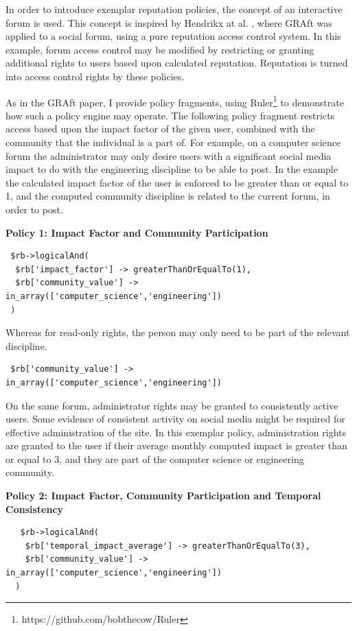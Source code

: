 In order to introduce exemplar reputation policies, the concept of an interactive forum is used. This concept is inspired by Hendrikx at al. \cite{graft_paper}, where GRAft was applied to a social forum, using a pure reputation access control system. In this example, forum access control may be modified by restricting or granting additional rights to users based upon calculated reputation. Reputation is turned into access control rights by these policies.

As in the GRAft paper, I provide policy fragments, using Ruler\footnote{https://github.com/bobthecow/Ruler} to demonstrate how such a policy engine may operate. The following policy fragment restricts access based upon the impact factor of the given user, combined with the community that the individual is a part of. For example, on a computer science forum the administrator may only desire users with a significant social media impact to do with the engineering discipline to be able to post. In the example the calculated impact factor of the user is enforced to be greater than or equal to 1, and the computed community discipline is related to the current forum, in order to post. 


\begin{center}
 \textbf{Policy 1: Impact Factor and Community Participation}
\begin{verbatim} 
 $rb->logicalAnd(
  $rb['impact_factor'] -> greaterThanOrEqualTo(1),
  $rb['community_value'] -> in_array(['computer_science','engineering'])
 ) 
\end{verbatim}
\end{center}

Whereas for read-only rights, the person may only need to be part of the relevant discipline.

\begin{verbatim}
 $rb['community_value'] -> in_array(['computer_science','engineering'])
\end{verbatim}

On the same forum, administrator rights may be granted to consistently active users. Some evidence of consistent activity on social media might be required for effective administration of the site. In this exemplar policy, administration rights are granted to the user if their average monthly computed impact is greater than or equal to 3, and they are part of the computer science or engineering community. 

\begin{center}
 \textbf{Policy 2: Impact Factor, Community Participation and Temporal Consistency}
 \begin{verbatim}
   $rb->logicalAnd(
    $rb['temporal_impact_average'] -> greaterThanOrEqualTo(3),
    $rb['community_value'] -> in_array(['computer_science','engineering'])
  ) 
 \end{verbatim}
\end{center}
